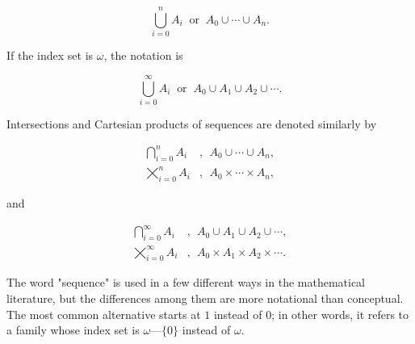 \begin{equation*}
\bigcup_{i = 0}^{n} A_{i} \: \text{ or } \: A_{0}\cup \cdots \cup A_{n}.
\end{equation*}

If the index set is $ \omega $, the notation is 

\begin{equation*}
\bigcup_{i = 0}^{\infty} A_{i} \: \text{ or } \: A_{0} \cup A_{1} \cup A_{2} \cup \cdots .
\end{equation*}

Intersections and Cartesian products of sequences are denoted similarly by

\begin{align*}
\bigcap_{i = 0}^{n} A_{i} &, \: \: A_{0}\cup \cdots \cup A_{n}, \\
\bigtimes_{i = 0}^{n} A_{i} &, \: \: A_{0}\times \cdots \times A_{n},
\end{align*}

and

\begin{align*}
\bigcap_{i = 0}^{\infty} A_{i} &, \: \: A_{0} \cup A_{1} \cup A_{2} \cup \cdots , \\
\bigtimes_{i = 0}^{\infty} A_{i} &, \:  \: A_{0} \times A_{1} \times A_{2} \times \cdots .
\end{align*}

The word "sequence" is used in a few different ways in the mathematical literature, but the differences among them are more notational than conceptual. The most common alternative starts at $1$ instead of $0$; in other words, it refers to a family whose index set is $\omega — \{ 0 \}$ instead of $ \omega $.